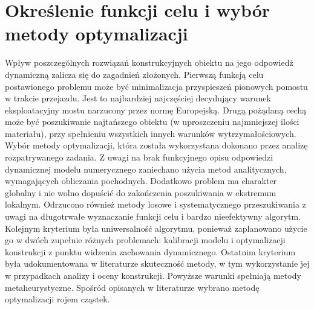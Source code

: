 \section{Określenie funkcji celu i wybór metody optymalizacji}
Wpływ poszczególnych rozwiązań konstrukcyjnych obiektu na jego odpowiedź dynamiczną zalicza się do zagadnień złożonych. 
Pierwszą funkcją celu postawionego problemu może być minimalizacja przyspieszeń pionowych pomostu w trakcie przejazdu. Jest to najbardziej najczęściej decydujący warunek eksploatacyjny mostu narzucony przez normę Europejską. Drugą pożądaną cechą może być poszukiwanie najtańszego obiektu (w uproszczeniu najmniejszej ilości materiału), przy spełnieniu wszystkich innych warunków wytrzymałościowych. Wybór metody optymalizacji, która została wykorzystana dokonano przez analizę rozpatrywanego zadania. Z uwagi na brak funkcyjnego opisu odpowiedzi dynamicznej modelu numerycznego zaniechano użycia metod analitycznych, wymagających obliczania pochodnych. Dodatkowo problem ma charakter globalny i nie wolno dopuścić do zakończenia poszukiwania w ekstremum lokalnym.  Odrzucono również metody losowe i systematycznego przeszukiwania z uwagi na długotrwałe wyznaczanie funkcji celu i bardzo nieefektywny algorytm. Kolejnym kryterium była uniwersalność algorytmu, ponieważ zaplanowano użycie go w dwóch zupełnie różnych problemach: kalibracji modelu i optymalizacji konstrukcji z punktu widzenia zachowania dynamicznego. Ostatnim kryterium była udokumentowana w literaturze skuteczność metody, w tym wykorzystanie jej w przypadkach analizy i oceny konstrukcji. Powyższe warunki spełniają metody metaheurystyczne. Spośród opisanych w literaturze wybrano metodę optymalizacji rojem cząstek.
